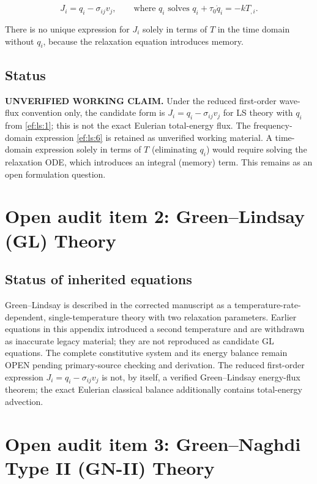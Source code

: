 \begin{equation}
J_i = q_i - \sigma_{ij}v_j,
\qquad \text{where } q_i \text{ solves } q_i + \tau_0\dot{q}_i = -k T_{,i}.
\label{ef:ls:7}
\end{equation}

There is no unique expression for $J_i$ solely in terms of $T$ in the time domain without $q_i$, because the relaxation equation introduces memory.

\subsection{Status}

\textbf{UNVERIFIED WORKING CLAIM.} Under the reduced first-order wave-flux convention only, the candidate form is $J_i = q_i - \sigma_{ij}v_j$ for LS theory with $q_i$ from \eqref{ef:ls:1}; this is not the exact Eulerian total-energy flux. The frequency-domain expression \eqref{ef:ls:6} is retained as unverified working material. A time-domain expression solely in terms of $T$ (eliminating $q_i$) would require solving the relaxation ODE, which introduces an integral (memory) term. This remains as an open formulation question.

\section{Open audit item 2: Green--Lindsay (GL) Theory}

\subsection{Status of inherited equations}

Green--Lindsay is described in the corrected manuscript as a temperature-rate-dependent, single-temperature theory with two relaxation parameters. Earlier equations in this appendix introduced a second temperature and are withdrawn as inaccurate legacy material; they are not reproduced as candidate GL equations. The complete constitutive system and its energy balance remain OPEN pending primary-source checking and derivation. The reduced first-order expression $J_i=q_i-\sigma_{ij}v_j$ is not, by itself, a verified Green--Lindsay energy-flux theorem; the exact Eulerian classical balance additionally contains total-energy advection.

\section{Open audit item 3: Green--Naghdi Type II (GN-II) Theory}

